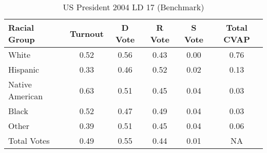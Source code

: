 \begin{table}[htb]
\begin{center}
\caption{US President 2004 LD 17 (Benchmark)}
\label{pres04_cvap_ld_17_benchmark}
\begin{tabular}{lccccc}
  \hline
Racial Group & Turnout & D Vote & R Vote & S Vote & Total CVAP \\ 
  \hline
White & 0.52  & 0.56  & 0.43  & 0.00  & 0.76 \\
    Hispanic & 0.33  & 0.46  & 0.52  & 0.02  & 0.13 \\
    Native American & 0.63  & 0.51  & 0.45  & 0.04  & 0.03 \\
    Black & 0.52  & 0.47  & 0.49  & 0.04  & 0.03 \\
    Other & 0.39  & 0.51  & 0.45  & 0.04  & 0.06 \\
    Total Votes & 0.49  & 0.55  & 0.44  & 0.01  &  NA \\
   \hline
\end{tabular}
\end{center}
\end{table}
